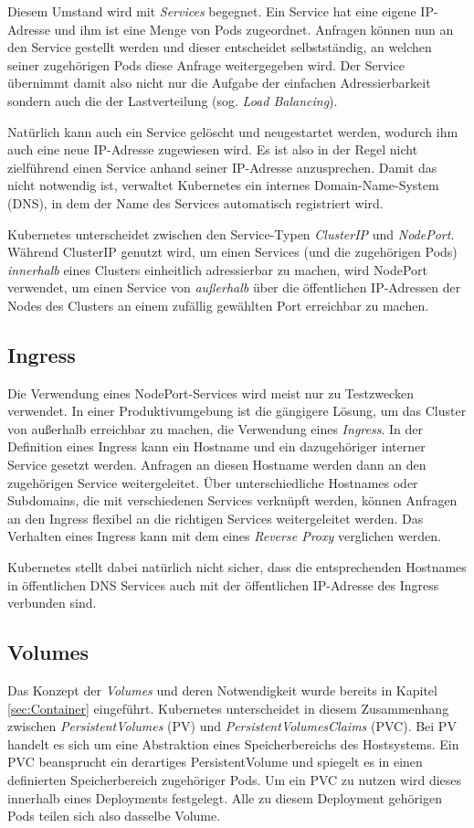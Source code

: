 \documentclass[11pt,a4paper]{article}
\begin{document}
Diesem Umstand wird mit \emph{Services} begegnet. Ein Service hat eine eigene IP-Adresse und ihm ist eine Menge
von Pods zugeordnet. Anfragen können nun an den Service gestellt werden und dieser entscheidet selbstständig,
an welchen seiner zugehörigen Pods diese Anfrage weitergegeben wird. Der Service übernimmt damit also 
nicht nur die Aufgabe der einfachen Adressierbarkeit sondern auch die der Lastverteilung (sog. \emph{Load Balancing}).

Natürlich kann auch ein Service gelöscht und neugestartet werden, wodurch ihm auch eine neue IP-Adresse zugewiesen wird.
Es ist also in der Regel nicht zielführend einen Service anhand seiner IP-Adresse anzusprechen.
Damit das nicht notwendig ist, verwaltet Kubernetes ein internes Domain-Name-System (DNS), in dem
der Name des Services automatisch registriert wird.

Kubernetes unterscheidet zwischen den Service-Typen \emph{ClusterIP} und \emph{NodePort}.
Während ClusterIP genutzt wird, um einen Services (und die zugehörigen Pods) \emph{innerhalb} eines Clusters
einheitlich adressierbar zu machen, wird NodePort verwendet, um einen Service von \emph{außerhalb}
über die öffentlichen IP-Adressen der Nodes des Clusters an einem zufällig gewählten Port erreichbar zu machen.

\subsection{Ingress}
Die Verwendung eines NodePort-Services wird meist nur zu Testzwecken verwendet. In einer Produktivumgebung
ist die gängigere Lösung, um das Cluster von außerhalb erreichbar zu machen, die Verwendung eines \emph{Ingress}.
In der Definition eines Ingress kann ein Hostname und ein dazugehöriger interner Service gesetzt werden.
Anfragen an diesen Hostname werden dann an den zugehörigen Service weitergeleitet. Über unterschiedliche Hostnames
oder Subdomains, die mit verschiedenen Services verknüpft werden, können Anfragen an den Ingress flexibel
an die richtigen Services weitergeleitet werden. Das Verhalten eines Ingress kann mit dem eines \emph{Reverse Proxy}
verglichen werden.

Kubernetes stellt dabei natürlich nicht sicher, dass die entsprechenden Hostnames in öffentlichen DNS Services auch mit
der öffentlichen IP-Adresse des Ingress verbunden sind.

\subsection{Volumes}
Das Konzept der \emph{Volumes} und deren Notwendigkeit wurde bereits in Kapitel \ref{sec:Container} eingeführt.
Kubernetes unterscheidet in diesem Zusammenhang zwischen \emph{PersistentVolumes} (PV) und \emph{PersistentVolumesClaims} (PVC).
Bei PV handelt es sich um eine Abstraktion eines Speicherbereichs des Hostsystems.
Ein PVC beansprucht ein derartiges PersistentVolume und spiegelt es in einen
definierten Speicherbereich zugehöriger Pods. Um ein PVC zu nutzen wird dieses innerhalb eines Deployments festgelegt.
Alle zu diesem Deployment gehörigen Pods teilen sich also dasselbe Volume.
\end{document}
